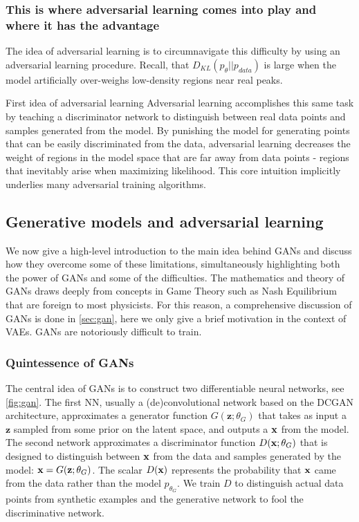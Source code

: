 \subsubsection{This is where adversarial learning comes into play and where it has the advantage}
The idea of adversarial learning is to circumnavigate this difficulty by using an adversarial learning procedure.  Recall, that $D_{KL}(p_\theta ||p_{data})$ is large when the model artificially over-weighs low-density regions near real peaks.
\begin{mybox}{First idea of adversarial learning}
	Adversarial learning accomplishes this same task by teaching a discriminator network to distinguish between real data points and samples generated from the model. By punishing the model for generating points that can be easily discriminated from the data, adversarial learning decreases the weight of regions in the model space that are far away from data points - regions that inevitably arise when maximizing likelihood. This core intuition implicitly underlies many adversarial training algorithms.
\end{mybox}


\subsection{Generative models and adversarial learning}
\label{subsec:vaeGanAdversarial}
We now give a high-level introduction to the main idea behind GANs and discuss how they overcome some of these limitations, simultaneously highlighting both the power of GANs and some of the difficulties. The mathematics and theory of GANs draws deeply from concepts in Game Theory such as Nash Equilibrium that are foreign to most physicists. For this reason, a comprehensive discussion of GANs is done in \ref{sec:gan}, here we only give a brief motivation in the context of VAEs. GANs are notoriously difficult to train.

\subsubsection{Quintessence of GANs}
The central idea of GANs is to construct two differentiable neural networks, see \ref{fig:gan}. The first NN, usually a (de)convolutional network based on the DCGAN architecture, approximates a generator function $G(\mathbf{z};\theta_G)$ that takes as input a $\mathbf{z}$ sampled from some prior on the latent space, and outputs a $\mathbf{x}$ from the model. The second network approximates a discriminator function $D(\mathbf{x} ; \theta_G)$ that is designed to distinguish between $\mathbf{x}$ from the data and samples generated by the model: $\mathbf{x}=G(\mathbf{z};\theta_G)$. The scalar $D(\mathbf{x})$ represents the probability that $\mathbf{x}$ came from the data rather than the model $p_{\theta_G}$. We train $D$ to distinguish actual data points from synthetic examples and the generative network to fool the discriminative network.





